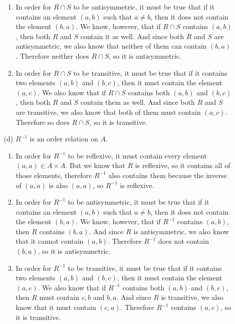 \documentclass[fleqn]{article}
\begin{document}
\begin{enumerate}
\begin{enumerate}
\begin{enumerate}
			\item %
			In order for \(R \cap S\) to be antisymmetric, it must be true that if it contains an element \((a, b)\) such that \(a \neq b\), then it does not contain the element \((b, a)\). We know, however, that if \(R \cap S\) contains \((a, b)\), then both \(R\) and \(S\) contain it as well. And since both \(R\) and \(S\) are antisymmetric, we also know that neither of them can contain \((b, a)\). Therefore neither does \(R \cap S\), so it is antisymmetric.

			\item %
			In order for \(R \cap S\) to be transitive, it must be true that if it contains two elements \((a, b)\) and \((b, c)\), then it must contain the element \((a, c)\). We also know that if \(R \cap S\) contains both \((a, b)\) and \((b, c)\), then both \(R\) and \(S\) contain them as well. And since both \(R\) and \(S\) are transitive, we also know that both of them must contain \((a, c)\). Therefore so does \(R \cap S\), so it is transitive.
		\end{enumerate}

		\item[(d)]
		\(R^{-1}\) is an order relation on \(A\).
		\begin{enumerate}
			\item %
			In order for \(R^{-1}\) to be reflexive, it must contain every element \((a, a) \in A \times A\). But we know that \(R\) is reflexive, so it contains all of those elements, therefore \(R^{-1}\) also contains them because the inverse of \((a, a)\) is also \((a, a)\), so \(R^{-1}\) is reflexive.

			\item %
			In order for \(R^{-1}\) to be antisymmetric, it must be true that if it contains an element \((a, b)\) such that \(a \neq b\), then it does not contain the element \((b, a)\). We know, however, that if \(R^{-1}\) contains \((a, b)\), then \(R\) contains \((b, a)\). And since \(R\) is antisymmetric, we also know that it cannot contain \((a, b)\). Therefore \(R^{-1}\) does not contain \((b, a)\), so it is antisymmetric.

			\item %
			In order for \(R^{-1}\) to be transitive, it must be true that if it contains two elements \((a, b)\) and \((b, c)\), then it must contain the element \((a, c)\). We also know that if \(R^{-1}\) contains both \((a, b)\) and \((b, c)\), then \(R\) must contain \(c, b\) and \(b, a\). And since \(R\) is transitive, we also know that it must contain \((c, a)\). Therefore \(R^{-1}\) contains \((a, c)\), so it is transitive.
		\end{enumerate}
	\end{enumerate}


\end{enumerate}
\end{document}
